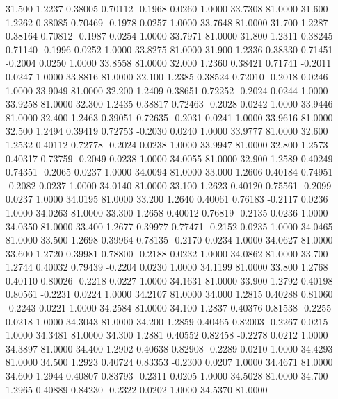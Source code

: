   31.500   1.2237   0.38005   0.70112  -0.1968   0.0260   1.0000  33.7308  81.0000
  31.600   1.2262   0.38085   0.70469  -0.1978   0.0257   1.0000  33.7648  81.0000
  31.700   1.2287   0.38164   0.70812  -0.1987   0.0254   1.0000  33.7971  81.0000
  31.800   1.2311   0.38245   0.71140  -0.1996   0.0252   1.0000  33.8275  81.0000
  31.900   1.2336   0.38330   0.71451  -0.2004   0.0250   1.0000  33.8558  81.0000
  32.000   1.2360   0.38421   0.71741  -0.2011   0.0247   1.0000  33.8816  81.0000
  32.100   1.2385   0.38524   0.72010  -0.2018   0.0246   1.0000  33.9049  81.0000
  32.200   1.2409   0.38651   0.72252  -0.2024   0.0244   1.0000  33.9258  81.0000
  32.300   1.2435   0.38817   0.72463  -0.2028   0.0242   1.0000  33.9446  81.0000
  32.400   1.2463   0.39051   0.72635  -0.2031   0.0241   1.0000  33.9616  81.0000
  32.500   1.2494   0.39419   0.72753  -0.2030   0.0240   1.0000  33.9777  81.0000
  32.600   1.2532   0.40112   0.72778  -0.2024   0.0238   1.0000  33.9947  81.0000
  32.800   1.2573   0.40317   0.73759  -0.2049   0.0238   1.0000  34.0055  81.0000
  32.900   1.2589   0.40249   0.74351  -0.2065   0.0237   1.0000  34.0094  81.0000
  33.000   1.2606   0.40184   0.74951  -0.2082   0.0237   1.0000  34.0140  81.0000
  33.100   1.2623   0.40120   0.75561  -0.2099   0.0237   1.0000  34.0195  81.0000
  33.200   1.2640   0.40061   0.76183  -0.2117   0.0236   1.0000  34.0263  81.0000
  33.300   1.2658   0.40012   0.76819  -0.2135   0.0236   1.0000  34.0350  81.0000
  33.400   1.2677   0.39977   0.77471  -0.2152   0.0235   1.0000  34.0465  81.0000
  33.500   1.2698   0.39964   0.78135  -0.2170   0.0234   1.0000  34.0627  81.0000
  33.600   1.2720   0.39981   0.78800  -0.2188   0.0232   1.0000  34.0862  81.0000
  33.700   1.2744   0.40032   0.79439  -0.2204   0.0230   1.0000  34.1199  81.0000
  33.800   1.2768   0.40110   0.80026  -0.2218   0.0227   1.0000  34.1631  81.0000
  33.900   1.2792   0.40198   0.80561  -0.2231   0.0224   1.0000  34.2107  81.0000
  34.000   1.2815   0.40288   0.81060  -0.2243   0.0221   1.0000  34.2584  81.0000
  34.100   1.2837   0.40376   0.81538  -0.2255   0.0218   1.0000  34.3043  81.0000
  34.200   1.2859   0.40465   0.82003  -0.2267   0.0215   1.0000  34.3481  81.0000
  34.300   1.2881   0.40552   0.82458  -0.2278   0.0212   1.0000  34.3897  81.0000
  34.400   1.2902   0.40638   0.82908  -0.2289   0.0210   1.0000  34.4293  81.0000
  34.500   1.2923   0.40724   0.83353  -0.2300   0.0207   1.0000  34.4671  81.0000
  34.600   1.2944   0.40807   0.83793  -0.2311   0.0205   1.0000  34.5028  81.0000
  34.700   1.2965   0.40889   0.84230  -0.2322   0.0202   1.0000  34.5370  81.0000
